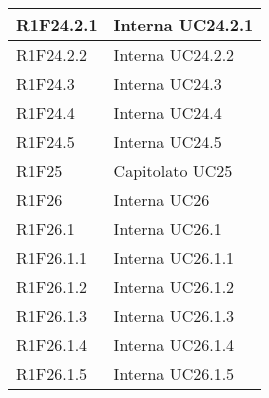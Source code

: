 \begin{center}
\begin{longtable}{|p{22mm}|p{44mm}|}
R1F24.2.1 &
Interna \newline
UC24.2.1 \newline
\\
\hline

R1F24.2.2 &
Interna \newline
UC24.2.2 \newline
\\
\hline

R1F24.3 &
Interna \newline
UC24.3 \newline
\\
\hline

R1F24.4 &
Interna \newline
UC24.4 \newline
\\
\hline

R1F24.5 &
Interna \newline
UC24.5 \newline
\\
\hline

R1F25 &
Capitolato \newline
UC25 \newline
\\
\hline

R1F26 &
Interna \newline
UC26 \newline
\\
\hline

R1F26.1 &
Interna \newline
UC26.1 \newline
\\
\hline

R1F26.1.1 &
Interna \newline
UC26.1.1 \newline
\\
\hline

R1F26.1.2 &
Interna \newline
UC26.1.2 \newline
\\
\hline

R1F26.1.3 &
Interna \newline
UC26.1.3 \newline
\\
\hline

R1F26.1.4 &
Interna \newline
UC26.1.4 \newline
\\
\hline

R1F26.1.5 &
Interna \newline
UC26.1.5 \newline
\\
\hline


\end{longtable}
\end{center}
